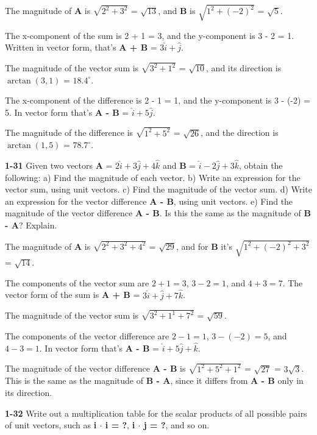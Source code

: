 \documentclass{amsart}
\begin{document}
The magnitude of \textbf{A} is $\sqrt{2^2+3^2}$ = $\sqrt{13}$,
and \textbf{B} is $\sqrt{1^2 + (-2)^2}$ = $\sqrt{5}$.

The x-component of the sum is 2 + 1 = 3, and the y-component is 3 - 2 = 1.
Written in vector form, that's \textbf{A + B} = $3 \hat i + \hat j$.

The magnitude of the vector sum is $\sqrt{3^2 + 1^2}$ = $\sqrt{10}$,
and its direction is $\arctan(3,1)$ = $18.4^\circ$.

The x-component of the difference is 2 - 1 = 1, and the y-component is 3 - (-2) = 5.
In vector form that's \textbf{A - B} = $\hat i + 5 \hat j$.

The magnitude of the difference is $\sqrt{1^2 + 5^2}$ = $\sqrt{26}$,
and the direction is $\arctan(1,5)$ = $78.7^\circ$.

\textbf{1-31} Given two vectors \textbf{A} = $2 \hat i + 3 \hat j + 4 \hat k$
and \textbf{B} = $\hat i - 2 \hat j + 3 \hat k$, obtain the following:\newline
a) Find the magnitude of each vector.\newline
b) Write an expression for the vector sum, using unit vectors.\newline
c) Find the magnitude of the vector sum.\newline
d) Write an expression for the vector difference \textbf{A - B}, using unit vectors.\newline
e) Find the magnitude of the vector difference \textbf{A - B}.
Is this the same as the magnitude of \textbf{B - A}?  Explain.

The magnitude of \textbf{A} is $\sqrt{2^2 + 3^2 + 4^2}$ = $\sqrt{29}$,
and for \textbf{B} it's $\sqrt{1^2 + (-2)^2 + 3^2}$ = $\sqrt{14}$.

The components of the vector sum are $2+1 = 3$, $3-2=1$, and $4+3=7$.
The vector form of the sum is \textbf{A + B} = $3 \hat i + \hat j + 7 \hat k$.

The magnitude of the vector sum is $\sqrt{3^2 + 1^1 + 7^2}$ = $\sqrt{59}$.

The components of the vector difference are $2-1=1$, $3-(-2)=5$, and $4-3=1$.
In vector form that's \textbf{A - B} = $\hat i + 5 \hat j + \hat k$.

The magnitude of the vector difference \textbf{A - B} is $\sqrt{1^2 + 5^2 + 1^2}$ = $\sqrt{27}$ = $3 \sqrt{3}$.
This is the same as the magnitude of \textbf{B - A}, since it differs from \textbf{A - B} only in its direction.

\textbf{1-32} Write out a multiplication table for the scalar products of all possible pairs of unit vectors,
such as \textbf{i $\cdot$ i = ?}, \textbf{i $\cdot $ j = ?}, and so on.
\end{document}
